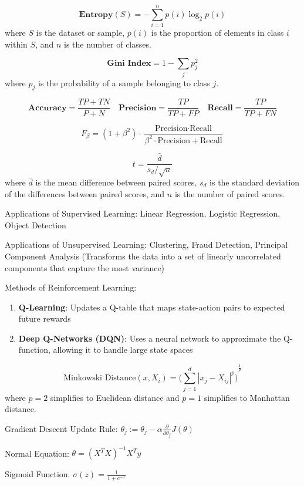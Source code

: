 \documentclass{article}
\begin{document}
\[\textbf{Entropy}(S)=-\sum_{i=1}^n p(i)\log_2 p(i)\] where $S$ is the dataset or sample, $p(i)$ is the proportion of elements in class $i$ within $S$, and $n$ is the number of classes.

\[\textbf{Gini Index}=1-\sum_j p_j^2\] where $p_j$ is the probability of a sample belonging to class $j$.

\[\textbf{Accuracy}=\frac{TP+TN}{P+N}\quad\textbf{Precision}=\frac{TP}{TP+FP}\quad\textbf{Recall}=\frac{TP}{TP+FN}\]

\[F_\beta = (1+\beta^2)\cdot\frac{\text{Precision}\cdot\text{Recall}}{\beta^2\cdot\text{Precision}+\text{Recall}}\]

\[t=\frac{\bar{d}}{s_d / \sqrt{n}}\] where $\bar{d}$ is the mean difference between paired scores, $s_d$ is the standard deviation of the differences between paired scores, and $n$ is the number of paired scores.
\vspace{1em}

Applications of Supervised Learning: Linear Regression, Logistic Regression, Object Detection
\vspace{1em}

Applications of Unsupervised Learning: Clustering, Fraud Detection, Principal Component Analysis (Transforms the data into a set of linearly uncorrelated components that capture the most variance)
\vspace{1em}

Methods of Reinforcement Learning:
\begin{enumerate}
    \item \textbf{Q-Learning}: Updates a Q-table that maps state-action pairs to expected future rewards
    \item \textbf{Deep Q-Networks (DQN)}: Uses a neural network to approximate the Q-function, allowing it to handle large state spaces
\end{enumerate}

\[\text{Minkowski Distance}(x, X_i)={\Bigg(\sum_{j=1}^d {|x_j - X_{ij}|}^p\Bigg)}^\frac{1}{p}\] where $p=2$ simplifies to Euclidean distance and $p=1$ simplifies to Manhattan distance.
\vspace{1em}

Gradient Descent Update Rule: $\theta_j := \theta_j - \alpha\frac{\partial}{\partial\theta_j}J(\theta)$

Normal Equation: $\theta={(X^T X)}^{-1}X^T y$
\vspace{1em}

Sigmoid Function: $\sigma(z)=\frac{1}{1+e^{-z}}$
\end{document}
